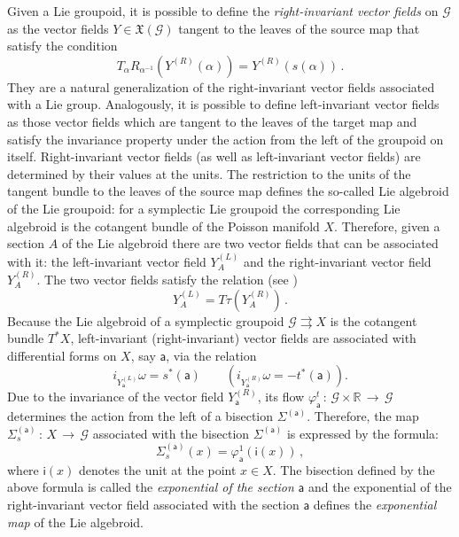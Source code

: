 \documentclass[12pt,a4paper]{article}
\numberwithin{equation}{section}
\theoremstyle{definition}
\newcommand{\cG}{\mathcal{G}}
\newcommand{\sfi}{\mathsf{i}}
\newcommand{\sfa}{\mathsf{a}}
\newcommand{\be}{\begin{equation}}
\newcommand{\ee}{\end{equation}}
\begin{document}
Given a Lie groupoid, it is possible to define the \textit{right-invariant vector fields} on $\cG$ as the vector fields $Y\in \mathfrak{X}(\cG)$ tangent to the leaves of the source map that satisfy the condition
\be\label{riVF}
T_{\alpha}R_{\alpha^{-1}}(Y^{(R)}(\alpha)) = Y^{(R)}(s(\alpha))\,.
\ee
They are a natural generalization of the right-invariant vector fields associated with a Lie group. Analogously, it is possible to define left-invariant vector fields as those vector fields which are tangent to the leaves of the target map and satisfy the invariance property under the action from the left of the groupoid on itself. Right-invariant vector fields (as well as left-invariant vector fields) are determined by their values at the units. The restriction to the units of the tangent bundle to the leaves of the source map defines the so-called Lie algebroid of the Lie groupoid: for a symplectic Lie groupoid the corresponding Lie algebroid is the cotangent bundle of the Poisson manifold $X$. Therefore, given a section $A$ of the Lie algebroid there are two vector fields that can be associated with it: the left-invariant vector field $Y_A^{(L)}$ and the right-invariant vector field $Y_A^{(R)}$. The two vector fields satisfy the relation (see \cite{Mackenzie}) 
\[
Y_A^{(L)} = T\tau(Y_A^{(R)})\,.
\] 
Because the Lie algebroid of a symplectic groupoid $\cG\rightrightarrows X$ is the cotangent bundle $T^*X$, left-invariant (right-invariant) vector fields are associated with differential forms on $X$, say $\sfa$, via the relation \cite{cdw-1987}
\[
i_{Y^{(L)}_{\sfa}}\omega = s^*(\sfa)  \qquad \left( i_{Y^{(R)}_{\sfa}}\omega = -t^*(\sfa) \right).
\]
Due to the invariance of the vector field $Y^{(R)}_{\sfa}$, its flow $\varphi^t_{\sfa}\,\colon\,\cG\times \mathbb{R}\,\rightarrow\,\cG$  determines the action from the left of a bisection $\Sigma^{(\sfa)}$. Therefore, the map $\Sigma^{({\sfa})}_s\,\colon\,X\,\rightarrow\,\cG$ associated with the bisection $\Sigma^{(\sfa)}$ is expressed by the formula: 
\begin{equation}\label{exponential}
\Sigma^{({\sfa})}_s(x) = \varphi^1_{\sfa} (\sfi(x))\,,
\end{equation}
where $\sfi(x)$ denotes the unit at the point $x\in X$. The bisection defined by the above formula is called the \textit{exponential of the section} $\sfa$ and the exponential of the right-invariant vector field associated with the section $\sfa$ defines the \textit{exponential map} of the Lie algebroid.
\end{document}

